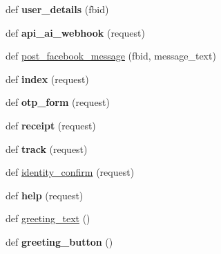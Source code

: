 \begin{DoxyCompactItemize}
\item 
\mbox{\label{namespacemessengerbot_1_1views_ab1f6e22eebdb8099aa11080d19d6d998}} 
def {\bfseries user\+\_\+details} (fbid)
\item 
\mbox{\label{namespacemessengerbot_1_1views_a197d2929ea4b8b6832965a1d66b60fd6}} 
def {\bfseries api\+\_\+ai\+\_\+webhook} (request)
\item 
def \hyperlink{namespacemessengerbot_1_1views_a1640e1dc00146c9ca843d7a746cf122d}{post\+\_\+facebook\+\_\+message} (fbid, message\+\_\+text)
\item 
\mbox{\label{namespacemessengerbot_1_1views_ad89592c43fcbe0c4cb07945221e109fc}} 
def {\bfseries index} (request)
\item 
\mbox{\label{namespacemessengerbot_1_1views_acb353edab49a475685bc8c8830e1d91e}} 
def {\bfseries otp\+\_\+form} (request)
\item 
\mbox{\label{namespacemessengerbot_1_1views_a690221e7f4637eb42ba9d734fb2f2493}} 
def {\bfseries receipt} (request)
\item 
\mbox{\label{namespacemessengerbot_1_1views_acc602ca40d1ea9e8630f8af91fed19c9}} 
def {\bfseries track} (request)
\item 
def \hyperlink{namespacemessengerbot_1_1views_a0422c7b7111b5e4de6bc606e67c554ef}{identity\+\_\+confirm} (request)
\item 
\mbox{\label{namespacemessengerbot_1_1views_a56c122fb7a1524b4722761a9d0093554}} 
def {\bfseries help} (request)
\item 
def \hyperlink{namespacemessengerbot_1_1views_a001bef22e3a7e6c9385e486f6e22b679}{greeting\+\_\+text} ()
\item 
\mbox{\label{namespacemessengerbot_1_1views_ac320ab20a7fa639fb9ba9207e5ab7942}} 
def {\bfseries greeting\+\_\+button} ()
\end{DoxyCompactItemize}
